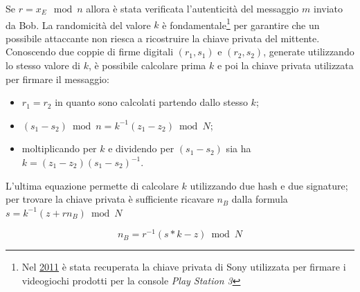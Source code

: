 Se $r=x_E \mod n$ allora è stata verificata l'autenticità del messaggio $m$ inviato da Bob.\newline\newline
La randomicità del valore $k$ è fondamentale\footnote{Nel \href{https://www.bbc.com/news/technology-12116051}{2011} è stata recuperata la chiave privata di Sony utilizzata per firmare i videogiochi prodotti per la console \textit{Play Station 3}} per garantire che un possibile attaccante non riesca a ricostruire la chiave privata del mittente. Conoscendo due coppie di firme digitali $(r_1,s_1)$ e $(r_2, s_2)$, generate utilizzando lo stesso valore di $k$, è possibile calcolare prima $k$ e poi la chiave privata utilizzata per firmare il messaggio:

\begin{itemize}
    \item $r_1=r_2$ in quanto sono calcolati partendo dallo stesso $k$;
    \item $(s_1-s_2)\bmod n=k^{-1}(z_1-z_2) \bmod N$;
    \item moltiplicando per $k$ e dividendo per $(s_1-s_2)$ sia ha $k=(z_1-z_2)(s_1-s_2)^{-1}$.
\end{itemize}
L'ultima equazione permette di calcolare $k$ utilizzando due hash e due signature; per trovare la chiave privata è sufficiente ricavare $n_B$ dalla formula $s=k^{-1}(z+rn_B)\bmod N$

\begin{equation}
    n_B = r^{-1} (s*k-z)\bmod N
\end{equation}

